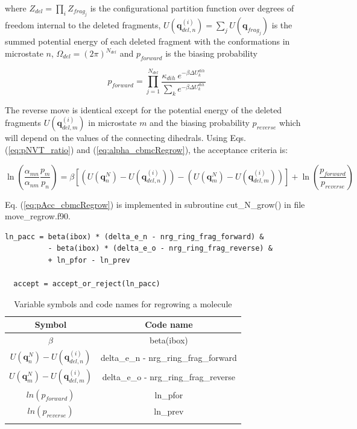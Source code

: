 where $Z_{del} = \prod_i Z_{frag_j}$ is the configurational partition function over degrees of freedom internal to the deleted fragments, $U(\mathbf{q}^{(i)}_{del,n}) = \sum_jU(\mathbf{q}_{frag_j})$ is the summed potential energy of each deleted fragment with the conformations in microstate $n$, $\Omega_{del} = (2\pi)^{N_{del}}$ and $p_{forward}$ is the biasing probability

\begin{equation}
p_{forward} = \prod_{j=1}^{N_{del}}{\frac{\kappa_{dih}\ e^{-\beta \Delta U_k^{dih}}}{\sum_k{e^{-\beta \Delta U_k^{dih}}}}}
\end{equation}

The reverse move is identical except for the potential energy of the deleted fragments $U(\mathbf{q}^{(i)}_{del,m})$ in microstate $m$ and the biasing probability $p_{reverse}$ which will depend on the values of the connecting dihedrals. Using Eqs. (\ref{eq:pNVT_ratio}) and (\ref{eq:alpha_cbmcRegrow}), the acceptance criteria is:

\begin{equation}
\label{eq:pAcc_cbmcRegrow}
\ln\left( \frac{\alpha_{mn}}{\alpha_{nm}} \frac{p_m}{p_n} \right) = \beta \left[\left( U(\mathbf{q}^N_n) - U(\mathbf{q}^{(i)}_{del,n})\right) - \left(U(\mathbf{q}^N_m) - U(\mathbf{q}^{(i)}_{del,m})\right)\right] + \ln\left( \frac{p_{forward}}{p_{reverse}} \right)
\end{equation}

Eq. (\ref{eq:pAcc_cbmcRegrow}) is implemented in subroutine cut\_N\_grow() in file move\_regrow.f90. 

\begin{minipage}{\linewidth}
\begin{lstlisting}[firstnumber=426, caption=move\_regrow.f90, label=code:cbmcRegrow]
  ln_pacc = beta(ibox) * (delta_e_n - nrg_ring_frag_forward) &
          - beta(ibox) * (delta_e_o - nrg_ring_frag_reverse) &
          + ln_pfor - ln_prev

  accept = accept_or_reject(ln_pacc)
\end{lstlisting}
\end{minipage}

\begin{table}
\caption{Variable symbols and code names for regrowing a molecule}
\label{table:cbmcRegrow}
\centering
\begin{tabular}{|c|c|} \hline
 {\bf Symbol} & {\bf Code name} \\ \hline
 $\beta$ & beta(ibox) \\
 $U(\mathbf{q}^N_n) - U(\mathbf{q}^{(i)}_{del,n})$ & delta\_e\_n - nrg\_ring\_frag\_forward \\
 $U(\mathbf{q}^N_m) - U(\mathbf{q}^{(i)}_{del,m})$ & delta\_e\_o - nrg\_ring\_frag\_reverse \\
 $ln(p_{forward})$ & ln\_pfor \\
 $ln(p_{reverse})$ & ln\_prev \\
 \hline
\multicolumn{2}{c}{}
\end{tabular}
\end{table}

